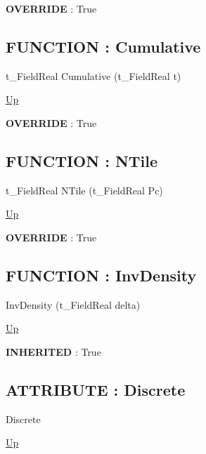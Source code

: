 \par
\par
\textbf{OVERRIDE} : True \\
\subsection*{FUNCTION : Cumulative}
\hypertarget{ecldoc:linearregression.ols.distributionbase.cumulative}{}
\begin{minipage}[t]{\textwidth}
\begin{flushleft}
t\_FieldReal Cumulative (t\_FieldReal t)
\end{flushleft}
\end{minipage}
\hyperlink{ecldoc:linearregression.ols.normaldistribution}{Up}

\par
\par
\textbf{OVERRIDE} : True \\
\subsection*{FUNCTION : NTile}
\hypertarget{ecldoc:linearregression.ols.distributionbase.ntile}{}
\begin{minipage}[t]{\textwidth}
\begin{flushleft}
t\_FieldReal NTile (t\_FieldReal Pc)
\end{flushleft}
\end{minipage}
\hyperlink{ecldoc:linearregression.ols.normaldistribution}{Up}

\par
\par
\textbf{OVERRIDE} : True \\
\subsection*{FUNCTION : InvDensity}
\hypertarget{ecldoc:linearregression.ols.distributionbase.invdensity}{}
\begin{minipage}[t]{\textwidth}
\begin{flushleft}
 InvDensity (t\_FieldReal delta)
\end{flushleft}
\end{minipage}
\hyperlink{ecldoc:linearregression.ols.normaldistribution}{Up}

\par
\par
\textbf{INHERITED} : True \\
\subsection*{ATTRIBUTE : Discrete}
\hypertarget{ecldoc:linearregression.ols.distributionbase.discrete}{}
\begin{minipage}[t]{\textwidth}
\begin{flushleft}
 Discrete 
\end{flushleft}
\end{minipage}
\hyperlink{ecldoc:linearregression.ols.normaldistribution}{Up}

